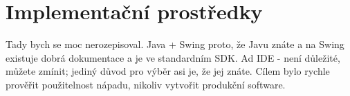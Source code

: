 \section{Implementační prostředky}



Tady bych se moc nerozepisoval. Java + Swing proto, že Javu znáte a na
Swing existuje dobrá dokumentace a je ve standardním SDK. Ad IDE - není
důležité, můžete zmínit; jediný důvod pro výběr asi je, že jej znáte.
Cílem bylo rychle prověřit použitelnost nápadu, nikoliv vytvořit
produkční software.